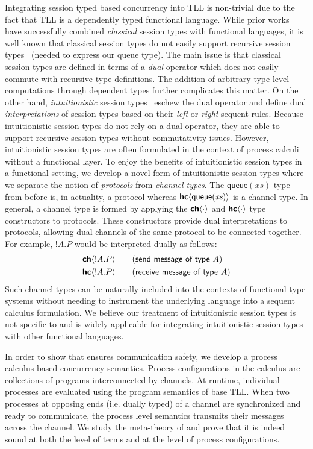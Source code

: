 Integrating session typed based concurrency into TLL is non-trivial due to the
fact that TLL is a dependently typed functional language. While prior
works~\cite{gay10,wadler12} have successfully combined \emph{classical} session
types with functional languages, it is well known that classical session types
do not easily support recursive session types~\cite{gay20} (needed to express
our \textsf{queue} type).  The main issue is that classical session types are
defined in terms of a \emph{dual} operator which does not easily commute with
recursive type definitions. The addition of arbitrary type-level computations
through dependent types further complicates this matter.  On the other hand,
\emph{intuitionistic} session types~\cite{caires10} eschew the dual operator and
define dual \emph{interpretations} of session types based on their \emph{left} or
\emph{right} sequent rules.  Because intuitionistic session types do not rely on
a dual operator, they are able to support recursive session types without
commutativity issues. However, intuitionistic session types are often formulated
in the context of process calculi without a functional layer. To enjoy the
benefits of intuitionistic session types in a functional setting, we develop a
novel form of intuitionistic session types where we separate the notion of
\emph{protocols} from \emph{channel types}. The $\textsf{queue}(\textit{xs})$
type from before is, in actuality, a protocol whereas
${\textbf{\textsf{hc}}\langle{\textsf{queue}(\textit{xs})}\rangle}$ is a channel type. In general, a channel type
is formed by applying the ${\textbf{\textsf{ch}}\langle{\cdot}\rangle}$ and ${\textbf{\textsf{hc}}\langle{\cdot}\rangle}$ type constructors to
protocols. These constructors provide dual interpretations to protocols,
allowing dual channels of the same protocol to be connected together. For
example, $!A. P$ would be interpreted dually as follows:
\begin{alignat*}{2}
  &{\textbf{\textsf{ch}}\langle{!A. P}\rangle}\quad &&(\textsf{send message of type } A) \\
  &{\textbf{\textsf{hc}}\langle{!A. P}\rangle}\quad &&(\textsf{receive message of type } A)
\end{alignat*}
Such channel types can be naturally included into the contexts of functional
type systems without needing to instrument the underlying language into a
sequent calculus formulation.  We believe our treatment of intuitionistic
session types is not specific to \TLLC{} and is widely applicable for
integrating intuitionistic session types with other functional languages.

In order to show that \TLLC{} ensures communication safety, we develop a process
calculus based concurrency semantics. Process configurations in the calculus are
collections of \TLLC{} programs interconnected by channels. At runtime,
individual processes are evaluated using the program semantics of base TLL. When
two processes at opposing ends (i.e. dually typed) of a channel are synchronized
and ready to communicate, the process level semantics transmits their messages
across the channel. We study the meta-theory of \TLLC{} and prove that it is
indeed sound at both the level of terms and at the level of process
configurations.

